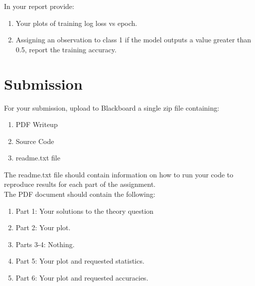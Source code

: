 \documentclass[12pt]{article}
\begin{document}
\noindent
In your report provide:
\begin{enumerate}
\item Your plots of training log loss vs epoch.
\item Assigning an observation to class 1 if the model outputs a value greater than 0.5, report the training accuracy.
\end{enumerate}

\newpage
\section*{Submission}
For your submission, upload to Blackboard a single zip file containing:

\begin{enumerate}
\item PDF Writeup
\item Source Code
\item readme.txt file
\end{enumerate}

\noindent
The readme.txt file should contain information on how to run your code to reproduce results for each part of the assignment.\\

\noindent
The PDF document should contain the following:

\begin{enumerate}
\item Part 1: Your solutions to the theory question
\item Part 2: Your plot.
\item Parts 3-4: Nothing.
\item Part 5: Your plot and requested statistics.
\item Part 6: Your plot and requested accuracies.
\end{enumerate}
\end{document}
